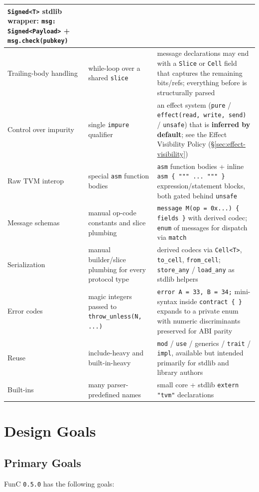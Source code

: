 \documentclass[12pt,oneside]{article}
\begin{document}
\begin{longtable}{|p{}|p{}|p{}|}
\verb|Signed<T>| stdlib wrapper: \verb|msg: Signed<Payload>| +
\verb|msg.check(pubkey)| \\ \hline
Trailing-body handling &
while-loop over a shared \verb|slice| &
message declarations may end with a \verb|Slice| or \verb|Cell| field
that captures the remaining bits/refs; everything before is
structurally parsed \\ \hline
Control over impurity &
single \verb|impure| qualifier &
an effect system (\verb|pure| / \verb|effect(read, write, send)| /
\verb|unsafe|) that is \textbf{inferred by default}; see the Effect
Visibility Policy (\S\ref{sec:effect-visibility}) \\ \hline
Raw TVM interop &
special \verb|asm| function bodies &
\verb|asm| function bodies + inline \verb|asm { """ ... """ }|
expression/statement blocks, both gated behind \verb|unsafe| \\ \hline
Message schemas &
manual op-code constants and slice plumbing &
\verb|message M(op = 0x...) { fields }| with derived codec;
\verb|enum| of messages for dispatch via \verb|match| \\ \hline
Serialization &
manual builder/slice plumbing for every protocol type &
derived codecs via \verb|Cell<T>|, \verb|to_cell|, \verb|from_cell|;
\verb|store_any| / \verb|load_any| as stdlib helpers \\ \hline
Error codes &
magic integers passed to \verb|throw_unless(N, ...)| &
\verb|error A = 33, B = 34;| mini-syntax inside \verb|contract { }|
expands to a private enum with numeric discriminants preserved for
ABI parity \\ \hline
Reuse &
include-heavy and built-in-heavy &
\verb|mod| / \verb|use| / generics / \verb|trait| / \verb|impl|,
available but intended primarily for stdlib and library authors \\ \hline
Built-ins &
many parser-predefined names &
small core + stdlib \verb|extern "tvm"| declarations \\ \hline
\end{longtable}

\section{Design Goals}
\subsection{Primary Goals}
FunC \verb|0.5.0| has the following goals:
\end{document}
